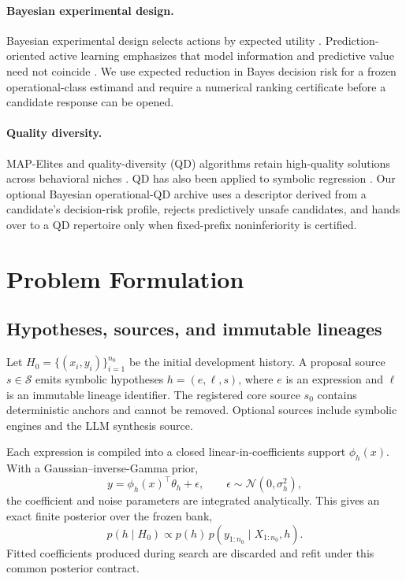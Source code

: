 \documentclass[twoside]{article}
\begin{document}
\paragraph{Bayesian experimental design.}
Bayesian experimental design selects actions by expected utility
\cite{chaloner1995bayesian}. Prediction-oriented active learning emphasizes
that model information and predictive value need not coincide
\cite{bickfordsmith2023prediction}. We use expected reduction in Bayes
decision risk for a frozen operational-class estimand and require a numerical
ranking certificate before a candidate response can be opened.

\paragraph{Quality diversity.}
MAP-Elites and quality-diversity (QD) algorithms retain high-quality solutions
across behavioral niches \cite{mouret2015mapelites}. QD has also been applied
to symbolic regression \cite{trujillo2025qdsr}. Our optional Bayesian
operational-QD archive uses a descriptor derived from a candidate's
decision-risk profile, rejects predictively unsafe candidates, and hands over
to a QD repertoire only when fixed-prefix noninferiority is certified.

\section{Problem Formulation}

\subsection{Hypotheses, sources, and immutable lineages}

Let \(H_0=\{(x_i,y_i)\}_{i=1}^{n_0}\) be the initial development history.
A proposal source \(s\in\mathcal S\) emits symbolic hypotheses
\(h=(e,\ell,s)\), where \(e\) is an expression and \(\ell\) is an immutable
lineage identifier. The registered core source \(s_0\) contains deterministic
anchors and cannot be removed. Optional sources include symbolic engines and
the LLM synthesis source.

Each expression is compiled into a closed linear-in-coefficients support
\(\phi_h(x)\). With a Gaussian--inverse-Gamma prior,
\[
 y=\phi_h(x)^\top\theta_h+\epsilon,\qquad
 \epsilon\sim\mathcal N(0,\sigma_h^2),
\]
the coefficient and noise parameters are integrated analytically. This gives
an exact finite posterior over the frozen bank,
\[
 p(h\mid H_0)\propto p(h)\,p(y_{1:n_0}\mid X_{1:n_0},h).
\]
Fitted coefficients produced during search are discarded and refit under this
common posterior contract.
\end{document}
